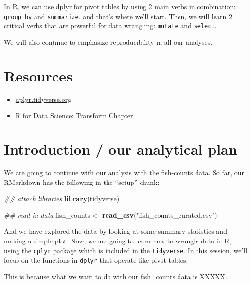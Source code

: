 \documentclass[]{book}
\newenvironment{Shaded}{\begin{snugshade}}{\end{snugshade}}
\newcommand{\CommentTok}[1]{\textcolor[rgb]{0.56,0.35,0.01}{\textit{#1}}}
\newcommand{\KeywordTok}[1]{\textcolor[rgb]{0.13,0.29,0.53}{\textbf{#1}}}
\newcommand{\NormalTok}[1]{#1}
\newcommand{\StringTok}[1]{\textcolor[rgb]{0.31,0.60,0.02}{#1}}
\providecommand{\tightlist}{%
  \setlength{\itemsep}{0pt}\setlength{\parskip}{0pt}}
\begin{document}
In R, we can use dplyr for pivot tables by using 2 main verbs in combination: \texttt{group\_by} and \texttt{summarize}, and that's where we'll start. Then, we will learn 2 critical verbs that are powerful for data wrangling: \texttt{mutate} and \texttt{select}.

We will also continue to emphasize reproducibility in all our analyses.

\hypertarget{resources-5}{%
\section{Resources}\label{resources-5}}

\begin{itemize}
\tightlist
\item
  \href{https://dplyr.tidyverse.org/}{dplyr.tidyverse.org}
\item
  \href{https://r4ds.had.co.nz/transform.html}{R for Data Science: Transform Chapter}
\end{itemize}

\hypertarget{introduction-our-analytical-plan}{%
\section{Introduction / our analytical plan}\label{introduction-our-analytical-plan}}

We are going to continue with our analysis with the fish-counts data. So far, our RMarkdown has the following in the ``setup'' chunk:

\begin{Shaded}
\begin{Highlighting}[]
\CommentTok{## attach libraries}
\KeywordTok{library}\NormalTok{(tidyverse)}

\CommentTok{## read in data}
\NormalTok{fish_counts <-}\StringTok{ }\KeywordTok{read_csv}\NormalTok{(}\StringTok{"fish_counts_curated.csv"}\NormalTok{)}
\end{Highlighting}
\end{Shaded}

And we have explored the data by looking at some summary statistics and making a simple plot. Now, we are going to learn how to wrangle data in R, using the \texttt{dplyr} package which is included in the \texttt{tidyverse}. In this session, we'll focus on the functions in \texttt{dplyr} that operate like pivot tables.

This is because what we want to do with our fish\_counts data is XXXXX.
\end{document}
